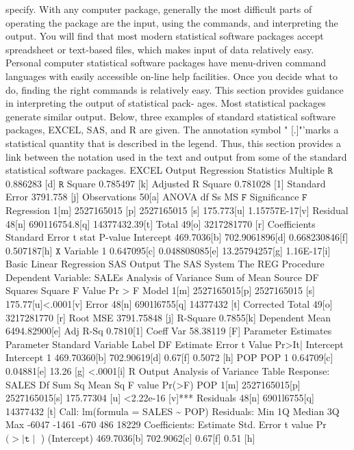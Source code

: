 \documentclass[11pt]{article}
\begin{document}
specify.
With any computer package, generally the most difficult parts of operating
the package are the input, using the commands, and interpreting the output. You
will find that most modern statistical software packages accept spreadsheet or
text-based files, which makes input of data relatively easy. Personal computer
 statistical software packages have menu-driven command languages with easily
accessible on-line help facilities. Once you decide what to do, finding the right
commands is relatively easy.
This section provides guidance in interpreting the output of statistical pack-
ages. Most statistical packages generate similar output. Below, three examples
of standard statistical software packages, EXCEL, SAS, and \(\mathrm{R}\) are given. The
 annotation symbol " [.]"'marks a statistical quantity that is described in the legend.
 Thus, this section provides a link between the notation used in the text and output
 from some of the standard statistical software packages.
EXCEL Output
Regression Statistics
Multiple \(\mathtt{R}\) 0.886283 [d]
\(\mathtt{R}\) Square 0.785497 [k]
Adjusted R Square 0.781028 [1]
Standard Error 3791.758 [j]
Observations 50[a]
 ANOVA
df Ss MS \(\mathtt{F}\) Significance \(\mathtt{F}\)
Regression 1[m] 2527165015 [p] 2527165015 [s] 175.773[u] 1.15757E-17[v]
Residual 48[n] 690116754.8[q] 14377432.39[t]
Total 49[o] 3217281770 [r]
Coefficients Standard Error t stat P-value
Intercept 469.7036[b] 702.9061896[d] 0.668230846[f] 0.507187[h]
\(\mathtt{X}\) Variable 1 0.647095[c] 0.048808085[e] 13.25794257[g] 1.16E-17[i]
 Basic Linear Regression
SAS Output
The SAS System
The REG Procedure
Dependent Variable: SALEs
Analysis of Variance
Sum of Mean
Source DF Squares Square F Value Pr > F
Model 1[m] 2527165015[p] 2527165015 [s] 175.77[u]<.0001[v]
Error 48[n] 6901l6755[q] 14377432 [t]
Corrected Total 49[o] 3217281770 [r]
Root MSE 3791.75848 [j] R-Square 0.7855[k]
Dependent Mean 6494.82900[e] Adj R-Sq 0.7810[1]
Coeff Var 58.38119 [F]
Parameter Estimates
Parameter Standard
Variable Label DF Estimate Error t Value Pr>It|
Intercept Intercept 1 469.70360[b] 702.90619[d] 0.67[f] 0.5072 [h]
POP POP 1 0.64709[c] 0.04881[e] 13.26 [g] <.0001[i]
R Output
Analysis of Variance Table
Response: SALES
Df Sum Sq Mean Sq F value Pr(>F)
POP 1[m] 2527165015[p] 2527165015[s] 175.77304 [u] <2.22e-16 [v]***
Residuals 48[n] 6901l6755[q] 14377432 [t]
Call: lm(formula = SALES \textasciitilde{} POP)
Residuals:
Min 1Q Median 3Q Max
-6047 -1461 -670 486 18229
Coefficients:
Estimate Std. Error t value Pr \(( > \mid{\mathtt t} \mid\) )
(Intercept) 469.7036[b] 702.9062[c] 0.67[f] 0.51 [h]
\end{document}
